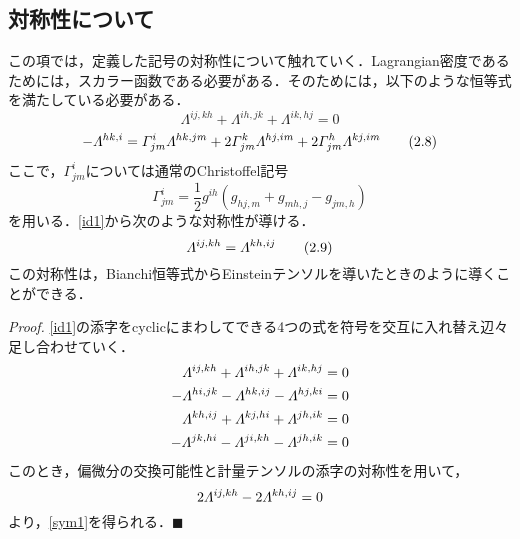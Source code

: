 \documentclass[main]{subfiles}
\begin{document}
\subsection{対称性について}
この項では，定義した記号の対称性について触れていく．Lagrangian密度であるためには，スカラー函数である必要がある．そのためには，以下のような恒等式を満たしている必要がある．
\begin{equation*}
    \varLambda^{ij,kh}+\varLambda^{ih,jk}+\varLambda^{ik,hj}=0
    \tag{2.7} \label{id1}
\end{equation*}
\begin{equation*}
    -\varLambda^{hk,i} = \varGamma^i_{jm} \varLambda^{hk,jm}+2\varGamma^k_{jm} \varLambda^{hj,im}+2\varGamma^h_{jm} \varLambda^{kj,im}
    \tag{2.8} \label{id2}
\end{equation*}
ここで，\(\varGamma^i_{jm}\)については通常のChristoffel記号
\begin{equation*}
    \varGamma^i_{jm} = \dfrac{1}{2}g^{ih}(g_{hj,m}+g_{mh,j}-g_{jm,h})
\end{equation*}
を用いる．\eqref{id1}から次のような対称性が導ける．
\begin{equation*}
    \varLambda^{ij,kh} = \varLambda^{kh,ij}
    \tag{2.9} \label{sym1}
\end{equation*}
この対称性は，Bianchi恒等式からEinsteinテンソルを導いたときのように導くことができる．

\textit{Proof.} \eqref{id1}の添字をcyclicにまわしてできる4つの式を符号を交互に入れ替え辺々足し合わせていく．
\begin{align*}
    \varLambda^{ij,kh}+\varLambda^{ih,jk}+\varLambda^{ik,hj}  & = 0 \\
    -\varLambda^{hi,jk}-\varLambda^{hk,ij}-\varLambda^{hj,ki} & = 0 \\
    \varLambda^{kh,ij}+\varLambda^{kj,hi}+\varLambda^{jh,ik}  & = 0 \\
    -\varLambda^{jk,hi}-\varLambda^{ji,kh}-\varLambda^{jh,ik} & = 0
\end{align*}
このとき，偏微分の交換可能性と計量テンソルの添字の対称性を用いて，
\begin{equation*}
    2\varLambda^{ij,kh}-2\varLambda^{kh,ij}=0
\end{equation*}
より，\eqref{sym1}を得られる．\(\blacksquare\)
\end{document}
